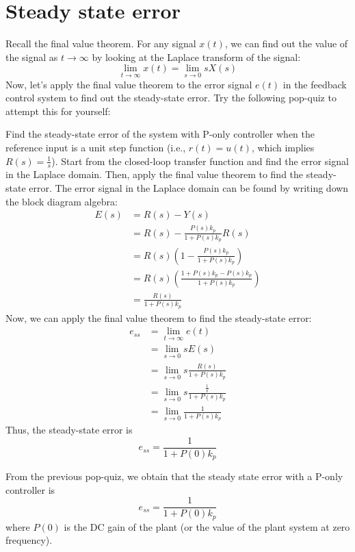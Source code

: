 \documentclass{ee122_notes}
\begin{document}
\section{Steady state error}
Recall the final value theorem. For any signal $x(t)$, we can find out the value of the signal as $t \to \infty$ by looking at the Laplace transform of the signal:
\[
    \lim_{t \to \infty} x(t) = \lim_{s \to 0} s X(s)
\]
Now, let's apply the final value theorem to the error signal $e(t)$ in the feedback control system to find out the steady-state error. Try the following pop-quiz to attempt this for yourself:
\begin{popquiz}
    Find the steady-state error of the system with P-only controller when the reference input is a unit step function (i.e., $r(t) = u(t)$, which implies $R(s) = \frac{1}{s}$). Start from the closed-loop transfer function and find the error signal in the Laplace domain. Then, apply the final value theorem to find the steady-state error.
\popqsplit
The error signal in the Laplace domain can be found by writing down the block diagram algebra:
\begin{align*}
    E(s) &= R(s) - Y(s) \\
    &= R(s) - \frac{P(s) k_p}{1 + P(s) k_p} R(s) \\
    &= R(s) \left(1 - \frac{P(s) k_p}{1 + P(s) k_p}\right) \\
    &= R(s) \left(\frac{1 + P(s) k_p - P(s) k_p}{1 + P(s) k_p}\right) \\
    &= \frac{R(s)}{1 + P(s) k_p}
\end{align*}
Now, we can apply the final value theorem to find the steady-state error:
\begin{align*}
    e_{ss} &= \lim_{t \to \infty} e(t) \\
    &= \lim_{s \to 0} s E(s) \\
    &= \lim_{s \to 0} s \frac{R(s)}{1 + P(s) k_p} \\
    &= \lim_{s \to 0} s \frac{\frac{1}{s}}{1 + P(s) k_p} \\
    &= \lim_{s \to 0} \frac{1}{1 + P(s) k_p}
\end{align*}
Thus, the steady-state error is
\[
    e_{ss} = \frac{1}{1 + P(0) k_p}
\]
\end{popquiz}
From the previous pop-quiz, we obtain that the steady state error with a P-only controller is 
\begin{equation*}
    e_{ss} = \frac{1}{1 + P(0) k_p}
\end{equation*}
where $P(0)$ is the DC gain of the plant (or the value of the plant system at zero frequency).
\end{document}
